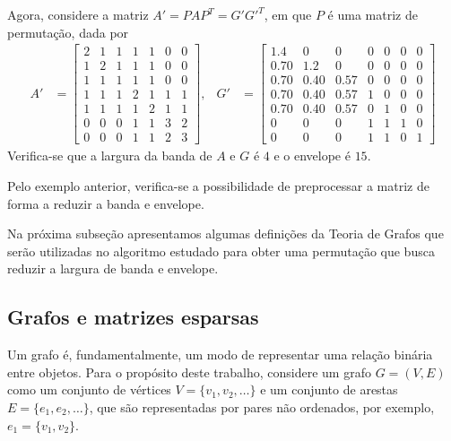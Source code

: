 \begin{exem}
    Agora, considere a matriz $A' = P A P^T = G' G'^T$, em que $P$ é uma matriz de
    permutação, dada por
    \begin{align*}
        A' &= \begin{bmatrix}
            2 & 1 & 1 & 1 & 1 & 0 & 0 \\
            1 & 2 & 1 & 1 & 1 & 0 & 0 \\
            1 & 1 & 1 & 1 & 1 & 0 & 0 \\
            1 & 1 & 1 & 2 & 1 & 1 & 1 \\
            1 & 1 & 1 & 1 & 2 & 1 & 1 \\
            0 & 0 & 0 & 1 & 1 & 3 & 2 \\
            0 & 0 & 0 & 1 & 1 & 2 & 3
        \end{bmatrix},
        & G' &= \begin{bmatrix}
             1.4 & 0 & 0 & 0 & 0 & 0 & 0 \\
            0.70 & 1.2 & 0 & 0 & 0 & 0 & 0 \\
            0.70 & 0.40 & 0.57 & 0 & 0 & 0 & 0 \\
            0.70 & 0.40 & 0.57 & 1 & 0 & 0 & 0 \\
            0.70 & 0.40 & 0.57 & 0 & 1 & 0 & 0 \\
            0 & 0 & 0 & 1 & 1 & 1 & 0 \\
            0 & 0 & 0 & 1 & 1 & 0 & 1
        \end{bmatrix}
    \end{align*}
    Verifica-se que a largura da banda de $A$ e $G$ é $4$ e o envelope é $15$.
\end{exem}

Pelo exemplo anterior, verifica-se a possibilidade de preprocessar a matriz
de forma a reduzir a banda e envelope.

Na próxima subseção apresentamos algumas definições da Teoria de Grafos que
serão utilizadas no algoritmo estudado para obter uma permutação que busca
reduzir a largura de banda e envelope.

\subsection{Grafos e matrizes esparsas}
Um grafo é, fundamentalmente, um modo de representar uma relação binária entre
objetos. Para o propósito deste trabalho, considere um grafo $G = (V, E)$ como
um conjunto de vértices $V = \{v_1, v_2, \ldots \}$ e um conjunto de
arestas $E = \{e_1, e_2, \ldots \}$, que são representadas por pares
não ordenados, por exemplo, $e_1 = \{v_1 , v_2\}$.

